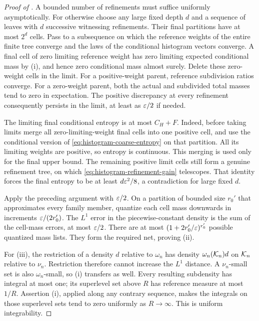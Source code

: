 \begin{proof}[Proof of ]
A bounded number of refinements must suffice uniformly asymptotically.
For otherwise choose any large fixed depth $d$ and a sequence of
leaves with $d$ successive witnessing refinements. Their final
partitions have at most $2^d$ cells. Pass to a subsequence on which the
reference weights of the entire finite tree converge and the laws of
the conditional histogram vectors converge. A final cell of zero
limiting reference weight has zero limiting expected conditional mass
by (i), and hence zero conditional mass almost surely. Delete these
zero-weight cells in the limit. For a positive-weight parent, reference
subdivision ratios converge. For a zero-weight parent, both the actual
and subdivided total masses tend to zero in expectation. The positive
discrepancy at every refinement consequently persists in the limit,
at least as $\varepsilon/2$ if needed.

The limiting final conditional entropy is at most $C_H+F$. Indeed,
before taking limits merge all zero-limiting-weight final cells into
one positive cell, and use the conditional version of
\eqref{eq:histogram-coarse-entropy} on that partition. All its limiting
weights are positive, so entropy is continuous. This merging is used
only for the final upper bound. The remaining positive limit cells
still form a genuine refinement tree, on which
\eqref{eq:histogram-refinement-gain} telescopes. That identity forces
the final entropy to be at least $d\varepsilon^2/8$, a contradiction for large
fixed $d$.

Apply the preceding argument with $\varepsilon/2$. On a partition of bounded
size $r_0'$ that approximates every family member, quantize each cell
mass downwards in increments $\varepsilon/(2r_0')$. The $L^1$ error in the
piecewise-constant density is the sum of the cell-mass errors, at most
$\varepsilon/2$. There are at most
$(1+2r_0'/\varepsilon)^{r_0'}$ possible quantized mass lists. They form the
required net, proving (ii).

For (iii), the restriction of a density $d$ relative to $\omega_n$ has
density $\omega_n(\mathcal K_n)d$ on $\mathcal K_n$ relative to $\nu_n$. Restriction
therefore cannot increase the $L^1$ distance. A $\nu_n$-small set is
also $\omega_n$-small, so (i) transfers as well. Every resulting
subdensity has integral at most one; its superlevel set above $R$ has
reference measure at most $1/R$. Assertion (i), applied along any
contrary sequence, makes the integrals on those superlevel sets tend
to zero uniformly as $R\to\infty$. This is uniform integrability.
\end{proof}

